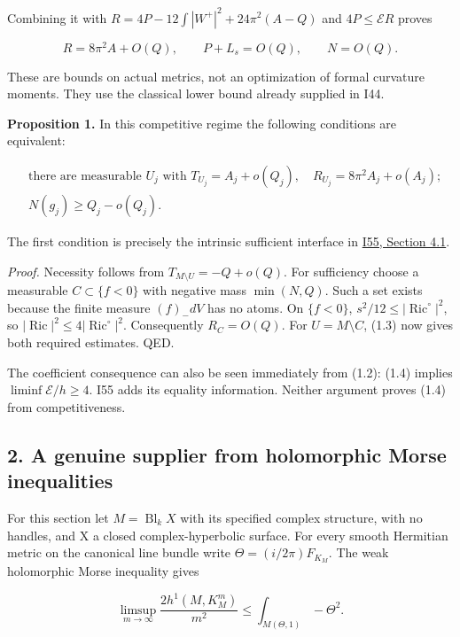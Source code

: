 \documentclass[
  10pt,
]{article}
\begin{document}
Combining it with \(R=4P-12\int|W^+|^2+24\pi^2(A-Q)\) and
\(4P\le\mathcal E R\) proves

\[
 R=8\pi^2A+O(Q),\qquad P+L_s=O(Q),\qquad N=O(Q).
 \tag{1.3}
\]

These are bounds on actual metrics, not an optimization of formal
curvature moments. They use the classical lower bound already supplied
in I44.

\textbf{Proposition 1.} In this competitive regime the following
conditions are equivalent:

\[
 \begin{aligned}
 &\text{there are measurable }U_j\text{ with }
 T_{U_j}=A_j+o(Q_j),\quad R_{U_j}=8\pi^2A_j+o(A_j);\\
 &N(g_j)\ge Q_j-o(Q_j).
 \end{aligned} \tag{1.4}
\]

The first condition is precisely the intrinsic sufficient interface in
\href{20260928_localization_and_coupled_filling.md}{I55, Section 4.1}.

\emph{Proof.} Necessity follows from \(T_{M\setminus U}=-Q+o(Q)\). For
sufficiency choose a measurable \(C\subset\{f<0\}\) with negative mass
\(\min(N,Q)\). Such a set exists because the finite measure \((f)_-dV\)
has no atoms. On \(\{f<0\}\),
\(s^2/12\le|\operatorname{Ric}^{\circ}|^2\), so
\(|\operatorname{Ric}|^2\le4|\operatorname{Ric}^{\circ}|^2\).
Consequently \(R_C=O(Q)\). For \(U=M\setminus C\), (1.3) now gives both
required estimates. QED.

The coefficient consequence can also be seen immediately from (1.2):
(1.4) implies \(\liminf\mathcal E/h\ge4\). I55 adds its equality
information. Neither argument proves (1.4) from competitiveness.

\hypertarget{a-genuine-supplier-from-holomorphic-morse-inequalities}{%
\subsection{2. A genuine supplier from holomorphic Morse
inequalities}\label{a-genuine-supplier-from-holomorphic-morse-inequalities}}

For this section let \(M=\operatorname{Bl}_k X\) with its specified
complex structure, with no handles, and X a closed complex-hyperbolic
surface. For every smooth Hermitian metric on the canonical line bundle
write \(\Theta=(i/2\pi)F_{K_M}\). The weak holomorphic Morse inequality
gives

\[
 \limsup_{m\to\infty}\frac{2h^1(M,K_M^m)}{m^2}
 \le\int_{M(\Theta,1)}-\Theta^2. \tag{2.1}
\]
\end{document}
